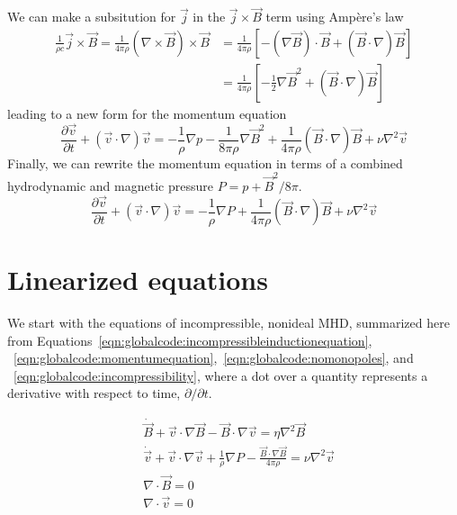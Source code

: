 \documentclass[letterpaper]{article}
\begin{document}
We can make a subsitution for $\vec{j}$ in the $\vec{j}\times\vec{B}$
term using Amp\`{e}re's law
\begin{align}
\frac{1}{\rho c}\vec{j}\times\vec{B} 
 = \frac{1}{4\pi \rho}\left(\nabla\times\vec{B}\right)\times\vec{B} 
 &= \frac{1}{4\pi \rho}\left[-\left(\nabla\vec{B}\right)\cdot\vec{B} 
                            +\left(\vec{B}\cdot\nabla\right)\vec{B}\right]
\nonumber \\
 &= \frac{1}{4\pi \rho}\left[-\frac{1}{2}\nabla\vec{B}^2 
                            +\left(\vec{B}\cdot\nabla\right)\vec{B}\right]
\end{align}
leading to a new form for the momentum equation
\begin{equation}
\frac{\partial \vec{v}}{\partial t} + \left(\vec{v}\cdot\nabla\right)\vec{v}
 = -\frac{1}{\rho}\nabla p - \frac{1}{8\pi\rho}\nabla\vec{B}^2
   + \frac{1}{4\pi\rho}\left(\vec{B}\cdot\nabla\right)\vec{B}
   + \nu \nabla^2 \vec{v}
\end{equation}
Finally, we can rewrite the momentum equation in terms of a combined
hydrodynamic and magnetic pressure $P=p+\vec{B}^2/8\pi$.
\begin{equation}
\frac{\partial \vec{v}}{\partial t} + \left(\vec{v}\cdot\nabla\right)\vec{v}
 = - \frac{1}{\rho}\nabla P 
   + \frac{1}{4\pi\rho}\left(\vec{B}\cdot\nabla\right)\vec{B}
   + \nu \nabla^2 \vec{v}
\label{eqn:globalcode:momentumequation}
\end{equation}

\section{Linearized equations}

We start with the equations of incompressible, nonideal MHD,
summarized here from
Equations~\ref{eqn:globalcode:incompressibleinductionequation},
~\ref{eqn:globalcode:momentumequation},~\ref{eqn:globalcode:nomonopoles},
and ~\ref{eqn:globalcode:incompressibility}, where a dot over a
quantity represents a derivative with respect to time,
$\partial/\partial t$.

\begin{align}
&\dot{\vec{B}} + \vec{v}\cdot\nabla\vec{B} - \vec{B}\cdot\nabla\vec{v}
 = \eta\nabla^2 \vec{B}
\\
&\dot{\vec{v}}+\vec{v}\cdot\nabla\vec{v}+\frac{1}{\rho}\nabla{P}
 - \frac{\vec{B}\cdot\nabla\vec{B}}{4\pi\rho}=\nu\nabla^2\vec{v}
\\
&\nabla\cdot\vec{B}=0
\\
&\nabla\cdot\vec{v}=0
\end{align}
\end{document}
